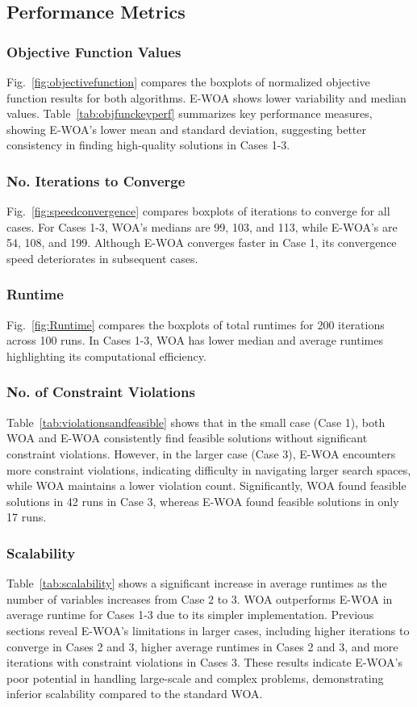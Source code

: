 \documentclass[conference]{IEEEtran}
\begin{document}
\subsection{Performance Metrics}

\subsubsection{Objective Function Values}
Fig.~\ref{fig:objectivefunction} compares the boxplots of normalized objective function results for both algorithms. E-WOA shows lower variability and median values. Table~\ref{tab:objfunckeyperf} summarizes key performance measures, showing E-WOA's lower mean and standard deviation, suggesting better consistency in finding high-quality solutions in Cases 1-3.

\subsubsection{No. Iterations to Converge}
Fig.~\ref{fig:speedconvergence} compares boxplots of iterations to converge for all cases. For Cases 1-3, WOA's medians are 99, 103, and 113, while E-WOA's are 54, 108, and 199. Although E-WOA converges faster in Case 1, its convergence speed deteriorates in subsequent cases.

\subsubsection{Runtime}
Fig.~\ref{fig:Runtime} compares the boxplots of total runtimes for 200 iterations across 100 runs. In Cases 1-3, WOA has lower median and average runtimes highlighting its computational efficiency.

\subsubsection{No. of Constraint Violations}
Table~\ref{tab:violationsandfeasible} shows that in the small case (Case 1), both WOA and E-WOA consistently find feasible solutions without significant constraint violations. However, in the larger case (Case 3), E-WOA encounters more constraint violations, indicating difficulty in navigating larger search spaces, while WOA maintains a lower violation count. Significantly, WOA found feasible solutions in 42 runs in Case 3, whereas E-WOA found feasible solutions in only 17 runs.

\subsubsection{Scalability}
Table~\ref{tab:scalability} shows a significant increase in average runtimes as the number of variables increases from Case 2 to 3. WOA outperforms E-WOA in average runtime for Cases 1-3 due to its simpler implementation. Previous sections reveal E-WOA's limitations in larger cases, including higher iterations to converge in Cases 2 and 3, higher average runtimes in Cases 2 and 3, and more iterations with constraint violations in Cases 3. These results indicate E-WOA's poor potential in handling large-scale and complex problems, demonstrating inferior scalability compared to the standard WOA.
\end{document}
